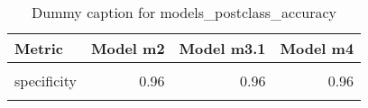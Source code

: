 \begin{table}
\centering
\caption{Dummy caption for models_postclass_accuracy}
\centering
\fontsize{10}{12}\selectfont
\begin{tabular}[t]{lrrr}
\toprule
Metric & Model m2 & Model m3.1 & Model m4\\
\midrule
\cellcolor{gray!10}{sensitivity} & \cellcolor{gray!10}{0.37} & \cellcolor{gray!10}{0.37} & \cellcolor{gray!10}{0.37}\\
specificity & 0.96 & 0.96 & 0.96\\
\cellcolor{gray!10}{overall\_accuracy} & \cellcolor{gray!10}{0.64} & \cellcolor{gray!10}{0.64} & \cellcolor{gray!10}{0.64}\\
\bottomrule
\end{tabular}
\end{table}
